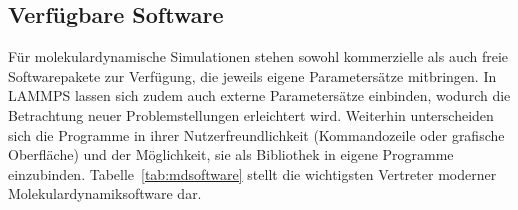 





\subsection{Verfügbare Software}

Für molekulardynamische Simulationen stehen sowohl kommerzielle als auch freie Softwarepakete zur Verfügung, die jeweils eigene Parametersätze mitbringen.
In LAMMPS lassen sich zudem auch externe Parametersätze einbinden, wodurch die Betrachtung neuer Problemstellungen erleichtert wird.
Weiterhin unterscheiden sich die Programme in ihrer Nutzerfreundlichkeit (Kommandozeile oder grafische Oberfläche) und der Möglichkeit, sie als Bibliothek in eigene Programme einzubinden.
Tabelle~\ref{tab:mdsoftware} stellt die wichtigsten Vertreter moderner Molekulardynamiksoftware dar.

